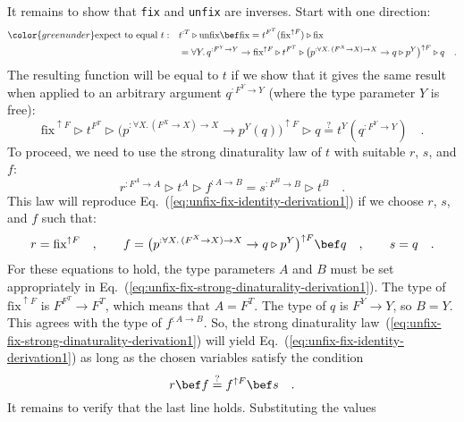 It remains to show that \lstinline!fix!
and \lstinline!unfix! are
inverses. Start with one direction:
\begin{align*}
{\color{greenunder}\text{expect to equal }t:}\quad & t^{:T}\triangleright\text{unfix}\bef\text{fix}=t^{F^{T}}(\text{fix}^{\uparrow F})\triangleright\text{fix}\\
 & =\forall Y.\,q^{:F^{Y}\rightarrow Y}\rightarrow\text{fix}^{\uparrow F}\triangleright t^{F^{T}}\triangleright\big(p^{:\forall X.\,(F^{X}\rightarrow X)\rightarrow X}\rightarrow q\triangleright p^{Y}\big)^{\uparrow F}\triangleright q\quad.
\end{align*}
The resulting function will be equal to $t$ if we show that it gives
the same result when applied to an arbitrary argument $q^{:F^{Y}\rightarrow Y}$
(where the type parameter $Y$ is free):
\begin{equation}
\text{fix}^{\uparrow F}\triangleright t^{F^{T}}\triangleright\big(p^{:\forall X.\,(F^{X}\rightarrow X)\rightarrow X}\rightarrow p^{Y}(q)\big)^{\uparrow F}\triangleright q\overset{?}{=}t^{Y}(q^{:F^{Y}\rightarrow Y})\quad.\label{eq:unfix-fix-identity-derivation1}
\end{equation}
To proceed, we need to use the strong dinaturality law of $t$ with
suitable $r$, $s$, and $f$:
\begin{equation}
r^{:F^{A}\rightarrow A}\triangleright t^{A}\triangleright f^{:A\rightarrow B}=s^{:F^{B}\rightarrow B}\triangleright t^{B}\quad.\label{eq:unfix-fix-strong-dinaturality-derivation1}
\end{equation}
This law will reproduce Eq.~(\ref{eq:unfix-fix-identity-derivation1})
if we choose $r$, $s$, and $f$ such that:
\[
r=\text{fix}^{\uparrow F}\quad,\quad\quad f=\big(p^{:\forall X.\,(F^{X}\rightarrow X)\rightarrow X}\rightarrow q\triangleright p^{Y}\big)^{\uparrow F}\bef q\quad,\quad\quad s=q\quad.
\]
For these equations to hold, the type parameters $A$ and $B$ must
be set appropriately in Eq.~(\ref{eq:unfix-fix-strong-dinaturality-derivation1}).
The type of $\text{fix}^{\uparrow F}$ is $F^{F^{T}}\rightarrow F^{T}$,
which means that $A=F^{T}$. The type of $q$ is $F^{Y}\rightarrow Y$,
so $B=Y$. This agrees with the type of $f^{:A\rightarrow B}$. So,
the strong dinaturality law~(\ref{eq:unfix-fix-strong-dinaturality-derivation1})
will yield Eq.~(\ref{eq:unfix-fix-identity-derivation1}) as long
as the chosen variables satisfy the condition
\[
r\bef f\overset{?}{=}f^{\uparrow F}\bef s\quad.
\]
It remains to verify that the last line holds. Substituting the values
